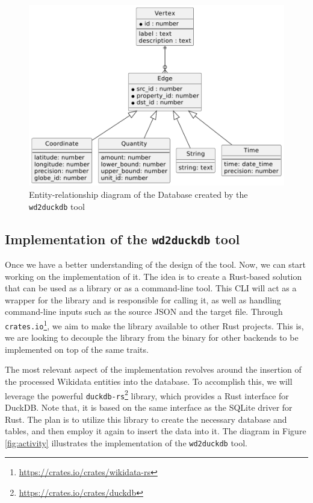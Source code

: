 \begin{figure}[ht]
    \centering
    \includegraphics[width=.75\linewidth]{figures/diagrams/10-1_wd2duckdb.pdf}
    \caption{Entity-relationship diagram of the Database created by the \texttt{wd2duckdb} tool}
    \label{fig:schema}
\end{figure}%

\subsection{Implementation of the \texttt{wd2duckdb} tool}

Once we have a better understanding of the design of the tool. Now, we can start working on the implementation of it. The idea is to create a Rust-based solution that can be used as a library or as a command-line tool. This CLI will act as a wrapper for the library and is responsible for calling it, as well as handling command-line inputs such as the source JSON and the target file. Through \texttt{crates.io}\footnote{\url{https://crates.io/crates/wikidata-rs}}, we aim to make the library available to other Rust projects. This is, we are looking to decouple the library from the binary for other backends to be implemented on top of the same traits.

The most relevant aspect of the implementation revolves around the insertion of the processed Wikidata entities into the database. To accomplish this, we will leverage the powerful \texttt{duckdb-rs}\footnote{\url{https://crates.io/crates/duckdb}} library, which provides a Rust interface for DuckDB. Note that, it is based on the same interface as the SQLite driver for Rust. The plan is to utilize this library to create the necessary database and tables, and then employ it again to insert the data into it. The diagram in Figure \ref{fig:activity} illustrates the implementation of the \texttt{wd2duckdb} tool.

